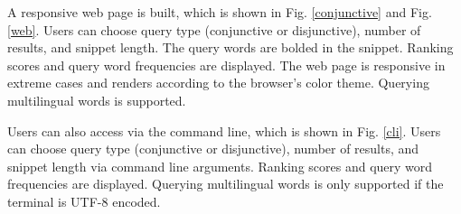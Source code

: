 \documentclass[12pt]{article}
\begin{document}
A responsive web page is built, which is shown in Fig. \ref{conjunctive} and Fig. \ref{web}.
Users can choose query type (conjunctive or disjunctive), number of
results, and snippet length. The query words are bolded in the snippet.
Ranking scores and query word frequencies are displayed. The web page is
responsive in extreme cases and renders according to the browser's color
theme. Querying multilingual words is supported.

Users can also access via the command line, which is shown in Fig. \ref{cli}.
Users can choose query type (conjunctive or disjunctive), number of
results, and snippet length via command line arguments. Ranking scores
and query word frequencies are displayed. Querying multilingual words is
only supported if the terminal is UTF-8 encoded.

\begin{figure}[!h]
  \begin{subfigure}{0.123\textwidth}

\end{subfigure}
\end{figure}
\end{document}

